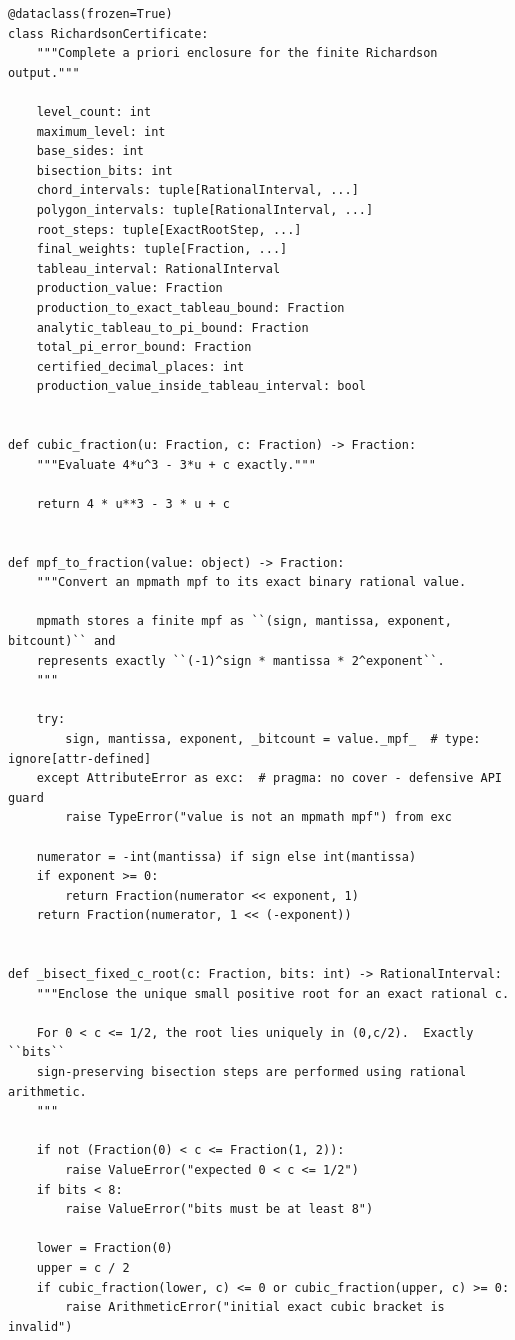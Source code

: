 \documentclass[11pt]{article}
\begin{document}
\begin{lstlisting}[style=pythonstyle,caption={Exact certification lane: \texttt{certified\_richardson.py}}]
@dataclass(frozen=True)
class RichardsonCertificate:
    """Complete a priori enclosure for the finite Richardson output."""

    level_count: int
    maximum_level: int
    base_sides: int
    bisection_bits: int
    chord_intervals: tuple[RationalInterval, ...]
    polygon_intervals: tuple[RationalInterval, ...]
    root_steps: tuple[ExactRootStep, ...]
    final_weights: tuple[Fraction, ...]
    tableau_interval: RationalInterval
    production_value: Fraction
    production_to_exact_tableau_bound: Fraction
    analytic_tableau_to_pi_bound: Fraction
    total_pi_error_bound: Fraction
    certified_decimal_places: int
    production_value_inside_tableau_interval: bool


def cubic_fraction(u: Fraction, c: Fraction) -> Fraction:
    """Evaluate 4*u^3 - 3*u + c exactly."""

    return 4 * u**3 - 3 * u + c


def mpf_to_fraction(value: object) -> Fraction:
    """Convert an mpmath mpf to its exact binary rational value.

    mpmath stores a finite mpf as ``(sign, mantissa, exponent, bitcount)`` and
    represents exactly ``(-1)^sign * mantissa * 2^exponent``.
    """

    try:
        sign, mantissa, exponent, _bitcount = value._mpf_  # type: ignore[attr-defined]
    except AttributeError as exc:  # pragma: no cover - defensive API guard
        raise TypeError("value is not an mpmath mpf") from exc

    numerator = -int(mantissa) if sign else int(mantissa)
    if exponent >= 0:
        return Fraction(numerator << exponent, 1)
    return Fraction(numerator, 1 << (-exponent))


def _bisect_fixed_c_root(c: Fraction, bits: int) -> RationalInterval:
    """Enclose the unique small positive root for an exact rational c.

    For 0 < c <= 1/2, the root lies uniquely in (0,c/2).  Exactly ``bits``
    sign-preserving bisection steps are performed using rational arithmetic.
    """

    if not (Fraction(0) < c <= Fraction(1, 2)):
        raise ValueError("expected 0 < c <= 1/2")
    if bits < 8:
        raise ValueError("bits must be at least 8")

    lower = Fraction(0)
    upper = c / 2
    if cubic_fraction(lower, c) <= 0 or cubic_fraction(upper, c) >= 0:
        raise ArithmeticError("initial exact cubic bracket is invalid")


\end{lstlisting}
\end{document}
